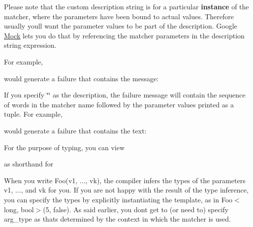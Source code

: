 Please note that the custom description string is for a particular {\bfseries{instance}} of the matcher, where the parameters have been bound to actual values. Therefore usually you\textquotesingle{}ll want the parameter values to be part of the description. Google \mbox{\hyperlink{class_mock}{Mock}} lets you do that by referencing the matcher parameters in the description string expression.

For example, 
\begin{DoxyCode}{0}
\DoxyCodeLine{           std::string(negation ? "isn't" : "is") + " in range [" +}
\DoxyCodeLine{           PrintToString(low) + ", " + PrintToString(hi) + "]") \{}
\DoxyCodeLine{\}}
\end{DoxyCode}
 would generate a failure that contains the message\+: 
\begin{DoxyCode}{0}
\end{DoxyCode}


If you specify {\ttfamily \char`\"{}\char`\"{}} as the description, the failure message will contain the sequence of words in the matcher name followed by the parameter values printed as a tuple. For example, 
\begin{DoxyCode}{0}
\end{DoxyCode}
 would generate a failure that contains the text\+: 
\begin{DoxyCode}{0}
\end{DoxyCode}


For the purpose of typing, you can view 
\begin{DoxyCode}{0}
\end{DoxyCode}
 as shorthand for 
\begin{DoxyCode}{0}
\end{DoxyCode}


When you write {\ttfamily Foo(v1, ..., vk)}, the compiler infers the types of the parameters {\ttfamily v1}, ..., and {\ttfamily vk} for you. If you are not happy with the result of the type inference, you can specify the types by explicitly instantiating the template, as in {\ttfamily Foo$<$long, bool$>$(5, false)}. As said earlier, you don\textquotesingle{}t get to (or need to) specify {\ttfamily arg\+\_\+type} as that\textquotesingle{}s determined by the context in which the matcher is used.

